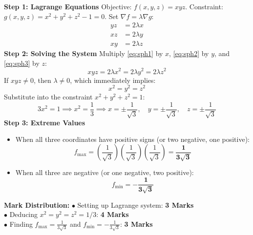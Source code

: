\begin{solutionbox}
\textbf{Step 1: Lagrange Equations}
Objective: $f(x,y,z) = xyz$. Constraint: $g(x,y,z) = x^2 + y^2 + z^2 - 1 = 0$.
Set $\nabla f = \lambda \nabla g$:
\begin{align}
yz &= 2\lambda x \label{eq:sph1} \\
xz &= 2\lambda y \label{eq:sph2} \\
xy &= 2\lambda z \label{eq:sph3}
\end{align}
\textbf{Step 2: Solving the System}
Multiply \eqref{eq:sph1} by $x$, \eqref{eq:sph2} by $y$, and \eqref{eq:sph3} by $z$:
\[
xyz = 2\lambda x^2 = 2\lambda y^2 = 2\lambda z^2
\]
If $xyz \neq 0$, then $\lambda \neq 0$, which immediately implies:
\[
x^2 = y^2 = z^2
\]
Substitute into the constraint $x^2 + y^2 + z^2 = 1$:
\[
3x^2 = 1 \implies x^2 = \frac{1}{3} \implies x = \pm \frac{1}{\sqrt{3}}, \quad y = \pm \frac{1}{\sqrt{3}}, \quad z = \pm \frac{1}{\sqrt{3}}
\]
\textbf{Step 3: Extreme Values}
\begin{itemize}[leftmargin=6mm]
    \item When all three coordinates have positive signs (or two negative, one positive):
    \[
    f_{\max} = \left(\frac{1}{\sqrt{3}}\right)\left(\frac{1}{\sqrt{3}}\right)\left(\frac{1}{\sqrt{3}}\right) = \mathbf{\frac{1}{3\sqrt{3}}}
    \]
    \item When all three are negative (or one negative, two positive):
    \[
    f_{\min} = \mathbf{-\frac{1}{3\sqrt{3}}}
    \]
\end{itemize}

\begin{markingrubric}
\textbf{Mark Distribution:}
$\bullet$ Setting up Lagrange system: \textbf{3 Marks}\\
$\bullet$ Deducing $x^2 = y^2 = z^2 = 1/3$: \textbf{4 Marks}\\
$\bullet$ Finding $f_{\max} = \frac{1}{3\sqrt{3}}$ and $f_{\min} = -\frac{1}{3\sqrt{3}}$: \textbf{3 Marks}
\end{markingrubric}
\end{solutionbox}

